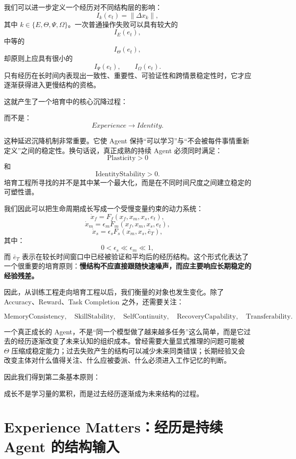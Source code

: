 我们可以进一步定义一个经历对不同结构层的影响：
\[
I_k(e_t)
=
\left\|
\Delta x_k
\right\|,
\]
其中 $k\in\{E,\Theta,\Psi,\Omega\}$。一次普通操作失败可以具有较大的
\[
I_E(e_t),
\]
中等的
\[
I_{\Theta}(e_t),
\]
却原则上应具有很小的
\[
I_{\Psi}(e_t),\qquad I_{\Omega}(e_t).
\]
只有经历在长时间内表现出一致性、重要性、可验证性和跨情景稳定性时，它才应逐渐获得进入更慢结构的资格。

这就产生了一个培育中的核心沉降过程：
\begin{statementbox}
\centering
{}
\end{statementbox}
而不是：
\[
Experience
\rightarrow
Identity.
\]

这种延迟沉降机制非常重要。它使 Agent 保持“可以学习”与“不会被每件事情重新定义”之间的稳定性。换句话说，真正成熟的持续 Agent 必须同时满足：
\[
\text{Plasticity}>0
\]
和
\[
\text{IdentityStability}>0.
\]
培育工程所寻找的并不是其中某一个最大化，而是在不同时间尺度之间建立稳定的可塑性谱。

我们因此可以把生命周期成长写成一个受慢变量约束的动力系统：
\[
\dot{x}_f
=
F_f(x_f,x_m,x_s,e_t),
\]
\[
\dot{x}_m
=
\epsilon_m
F_m(x_f,x_m,x_s,e_t),
\]
\[
\dot{x}_s
=
\epsilon_s
F_s(x_m,x_s,\bar e_T),
\]
其中：
\[
0<\epsilon_s\ll\epsilon_m\ll1,
\]
而 $\bar e_T$ 表示在较长时间窗口中已经被验证和平均后的经历结构。这个形式化表达了一个很重要的培育原则：\textbf{慢结构不应直接跟随快速噪声，而应主要响应长期稳定的经验残差。}

因此，从训练工程走向培育工程以后，我们衡量的对象也发生变化。除了 Accuracy、Reward、Task Completion 之外，还需要关注：

\[
\text{MemoryConsistency},
\quad
\text{SkillStability},
\quad
\text{SelfContinuity},
\quad
\text{RecoveryCapability},
\quad
\text{Transferability}.
\]

一个真正成长的 Agent，不是“同一个模型做了越来越多任务”这么简单，而是它过去的经历逐渐改变了未来认知的组织成本。曾经需要大量显式推理的问题可能被 $\Theta$ 压缩成稳定能力；过去失败产生的结构可以减少未来同类错误；长期经验又会改变主体对什么值得关注、什么应被委派、什么必须进入工作记忆的判断。

因此我们得到第二条基本原则：
\begin{proposition*}
成长不是学习量的累积，而是过去经历逐渐成为未来结构的过程。
\end{proposition*}

\section{Experience Matters：经历是持续 Agent 的结构输入}

